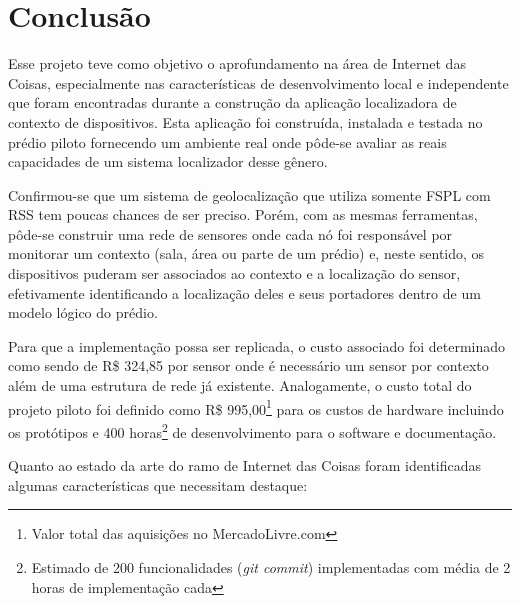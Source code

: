 \chapter{Conclusão}
\label{chap:Conclusao}


Esse projeto teve como objetivo o aprofundamento na área de Internet das Coisas,
especialmente nas características de desenvolvimento local e independente que
foram encontradas durante a construção da aplicação localizadora de contexto de
dispositivos. Esta aplicação foi construída, instalada e testada no prédio
piloto fornecendo um ambiente real onde pôde-se avaliar as reais capacidades de
um sistema localizador desse gênero.

Confirmou-se que um sistema de
geolocalização que utiliza somente FSPL com RSS tem poucas chances de ser
preciso. Porém, com as mesmas ferramentas, pôde-se construir uma rede de sensores
onde cada nó foi responsável por monitorar um contexto (sala, área ou parte de um
prédio) e, neste sentido, os dispositivos puderam ser associados ao contexto e a
localização do sensor, efetivamente identificando a localização deles
e seus portadores dentro de um modelo lógico do prédio.

Para que a implementação possa ser replicada, o custo associado foi determinado
como sendo de R\$ 324,85 por sensor onde é necessário um sensor por contexto além
de uma estrutura de rede já existente. Analogamente, o custo total do projeto
piloto foi definido como R\$ 995,00\footnote{Valor total das aquisições no
MercadoLivre.com} para os custos de hardware incluindo os protótipos e 400
horas\footnote{Estimado de 200 funcionalidades (\emph{git commit}) implementadas
com média de 2 horas de implementação cada} de desenvolvimento para o software e
documentação.

Quanto ao estado da arte do ramo de Internet das Coisas foram identificadas
algumas características que necessitam destaque:

